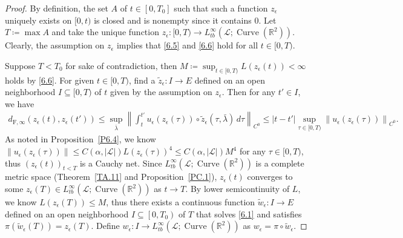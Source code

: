 \documentclass[reqno,centertags,12pt]{amsart}
\theoremstyle{definition}
\numberwithin{equation}{section}
\newcommand{\abs}[1]{\left\lvert#1\right\rvert}
\newcommand{\norm}[1]{\left\|#1\right\|}
\newcommand{\seq}[1]{\left( #1 \right)}
\newcommand{\bbR}{{\mathbb{R}}}
\begin{document}
\begin{proof}
    By definition, the set $A$ of $t\in\left[0,T_{0}\right]$
    such that such a function $z_{\epsilon}$ uniquely exists on $[0,t)$
    is closed and is nonempty since it contains $0$.
    Let $T\coloneqq\max A$ and take the unique function
    $z_{\epsilon}\colon[0,T)\to L_{tb}^{\infty}(\mathcal{L};\operatorname{Curve}(\bbR^{2}))$.
    Clearly, the assumption on $z_{\epsilon}$ implies that
    \eqref{6.5} and
    \eqref{6.6} hold for all $t\in[0,T)$.

    Suppose $T<T_{0}$ for sake of contradiction,
    then $M\coloneqq \sup_{t\in[0,T)}L(z_{\epsilon}(t)) < \infty$ holds by
    \eqref{6.6}. For given $t\in[0,T)$,
    find a $\tilde{z}_{\epsilon}\colon I\to E$ defined on an open neighborhood
    $I\subseteq [0,T)$ of $t$ given by the assumption on $z_{\epsilon}$.
    Then for any $t'\in I$, we have
    \begin{align*}
        d_{\mathrm{F},\infty}(z_{\epsilon}(t),z_{\epsilon}(t'))
        \leq \sup_{\bar{\lambda}}
        \norm{\int_{t}^{t'}u_{\epsilon}(z_{\epsilon}(\tau))
        \circ \tilde{z}_{\epsilon}(\tau,\bar{\lambda})\,d\tau}_{C^{0}}
        \leq \abs{t - t'}\sup_{\tau\in [0,T)}\norm{u_{\epsilon}(z_{\epsilon}(\tau))}_{C^{0}}.
    \end{align*}
    As noted in Proposition~\ref{P6.4}, we know
    $\norm{u_{\epsilon}(z_{\epsilon}(\tau))} \leq
    C(\alpha,\abs{\mathcal{L}})L(z_{\epsilon}(\tau))^{4} \leq C(\alpha,\abs{\mathcal{L}})M^{4}$
    for any $\tau\in[0,T)$, thus $\seq{z_{\epsilon}(t)}_{t<T}$ is a Cauchy net.
    Since $L_{tb}^{\infty}(\mathcal{L};\operatorname{Curve}(\bbR^{2}))$
    is a complete metric space (Theorem~\ref{TA.11} and
    Proposition~\ref{PC.1}), $z_{\epsilon}(t)$ converges to some
    $z_{\epsilon}(T)\in L_{tb}^{\infty}(\mathcal{L};\operatorname{Curve}(\bbR^{2}))$
    as $t\to T$. By lower semicontinuity of $L$, we know
    $L(z_{\epsilon}(T)) \leq M$, thus there exists a continuous function
    $\tilde{w}_{\epsilon}\colon I\to E$ defined on an open neighborhood
    $I\subseteq\left[0,T_{0}\right)$ of $T$ that
    solves \eqref{6.1} and satisfies
    $\pi(\tilde{w}_{\epsilon}(T)) = z_{\epsilon}(T)$.
    Define $w_{\epsilon}\colon I\to L_{tb}^{\infty}(\mathcal{L};\operatorname{Curve}(\bbR^{2}))$
    as $w_{\epsilon} = \pi\circ \tilde{w}_{\epsilon}$.


\end{proof}
\end{document}
